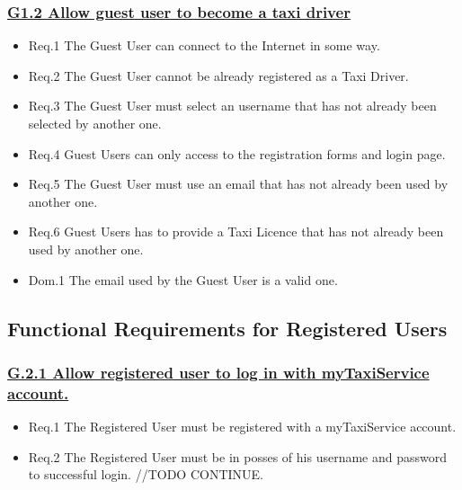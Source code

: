 \documentclass{report}
\begin{document}
			\subsubsection{\lbrack \hyperref[sec:g1_2]{G1.2 Allow guest user to become a taxi driver}\rbrack}

				\begin{itemize}
					\item \lbrack Req.1\rbrack \label{sec:fr1_g1_2} The Guest User can connect to the Internet in some way.
					\item \lbrack Req.2\rbrack \label{sec:fr2_g1_2} The Guest User cannot be already registered as a Taxi Driver.
					\item \lbrack Req.3\rbrack \label{sec:fr3_g1_2} The Guest User must select an username that has not already been selected by another one.
					\item \lbrack Req.4\rbrack \label{sec:fr4_g1_2} Guest Users can only access to the registration forms and login page.
					\item \lbrack Req.5\rbrack \label{sec:fr5_g1_2} The Guest User must use an email that has not already been used by another one.
					\item \lbrack Req.6\rbrack \label{sec:fr6_g1_2} Guest Users has to provide a Taxi Licence that has not already been used by another one.
					\item \lbrack Dom.1\rbrack \label{sec:da1_g1_2} The email used by the Guest User is a valid one.
				\end{itemize}

		\subsection{Functional Requirements for Registered Users}

			\subsubsection{\lbrack \hyperref[sec:g2_1]{G.2.1 Allow registered user to log in with myTaxiService account.}\rbrack}

				\begin{itemize}
					\item \lbrack Req.1\rbrack \label{sec:fr1_g2_1} The Registered User must be registered with a myTaxiService account.
					\item \lbrack Req.2\rbrack \label{sec:fr2_g2_1} The Registered User must be in posses of his username and password to successful login.
					//TODO CONTINUE.
				\end{itemize}
\end{document}
